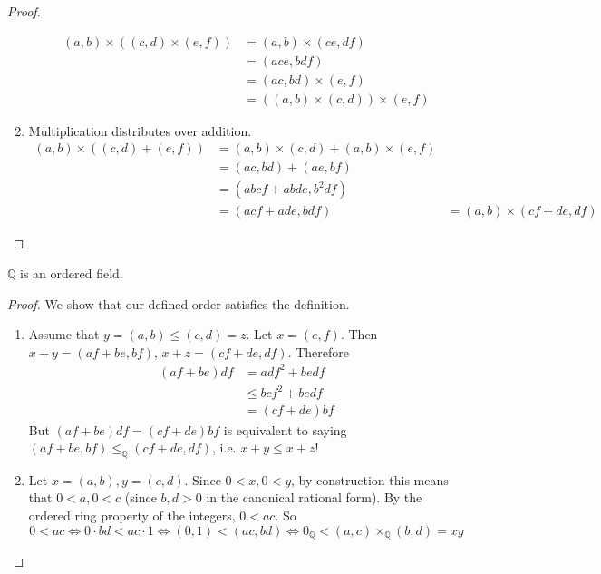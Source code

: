 \begin{proof}
\begin{enumerate}
      \begin{align}
        (a, b) \times ((c, d) \times (e, f)) & = (a, b) \times (ce, df) \\ 
                                             & = (ace, bdf) \\
                                             & = (ac, bd) \times (e, f) \\
                                             & = ((a, b) \times (c, d)) \times (e, f)
      \end{align}
      \item Multiplication distributes over addition. 
        \begin{align}
          (a, b) \times ((c, d) + (e, f)) & = (a, b) \times (c, d) + (a, b) \times (e, f) \\
                                          & = (ac, bd) + (ae, bf) \\
                                          & = (abcf + abde, b^2 df) \\
                                          & = (acf + ade, bdf)  
                                          & = (a, b) \times (cf + de, df)
        \end{align}
    \end{enumerate}
  \end{proof} 

  \begin{theorem}
    $\mathbb{Q}$ is an ordered field. 
  \end{theorem}
  \begin{proof}
    We show that our defined order satisfies the definition. 
    \begin{enumerate}
      \item Assume that $y = (a, b) \leq (c, d) = z$. Let $x = (e, f)$. Then $x + y = (af + be, bf)$, $x + z = (cf + de, df)$. Therefore 
      \begin{align}
        (af + be) df & = adf^2 + bedf \\ 
                     & \leq bcf^2 + bedf \\
                     & = (cf + de) bf
      \end{align} 
      But $(af + be) df = (cf + de) bf$ is equivalent to saying $(af + be, bf) \leq_{\mathbb{Q}} (cf + de, df)$, i.e. $x + y \leq x + z$!  

      \item Let $x = (a, b), y = (c, d)$. Since $0 < x, 0 < y$, by construction this means that $0 < a, 0 < c$ (since $b, d > 0$ in the canonical rational form). By the ordered ring property of the integers, $0 < ac$. So 
      \begin{equation}
        0 < ac \iff 0 \cdot bd < ac \cdot 1 \iff (0, 1) < (ac, bd)  \iff 0_{\mathbb{Q}} < (a, c) \times_{\mathbb{Q}} (b, d) = x y
      \end{equation}
    \end{enumerate}
  \end{proof}

